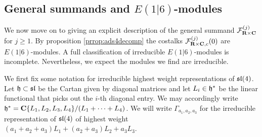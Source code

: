 \documentclass[../main.tex]{subfiles}
\begin{document}
\subsection{General summands and $E(1|6)$-modules}
We now move on to giving an explicit description of the general summand $\mathcal{F}^{(j)}_{\mathbf{R}\times \mathbf{C}}$ for $j \geq 1$. By proposition \ref{prrop:ads4decomp} the costalks $\mathcal{F}^{(j)}_{\mathbf{R}\times \mathbf{C}, c} (0)$ are $E(1|6)$-modules. A full classification of irreducible $E(1|6)$-modules is incomplete. Nevertheless, we expect the modules we find are irreducible.


We first fix some notation for irreducible highest weight representations of $\mathfrak{sl}(4)$. Let $\mathfrak{h}\subset \mathfrak{sl}$ be the Cartan given by diagonal matrices and let $L_i\in \mathfrak{h}^*$ be the linear functional that picks out the $i$-th diagonal entry. We may accordingly write $\mathfrak{h}^* = \mathbf{C} \{L_1, L_2, L_3, L_4\}/(L_1+\cdots + L_4)$. We will write $\Gamma_{a_1,a_2, a_3}$ for the irreducible representation of $\mathfrak{sl}(4)$ of highest weight $(a_1+a_2+a_3)L_1+(a_2+a_3)L_2 + a_3L_3$. 
\end{document}
